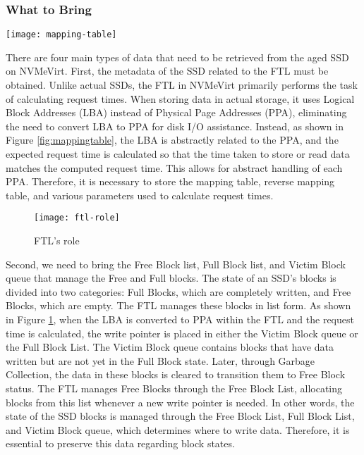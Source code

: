 \subsubsection{What to Bring}

\begin{figure*}[t]
    \centering
    \texttt{[image: mapping-table]}
    \caption{NVMeVirt’s relation between FTL and data save process}
    \label{fig:mappingtable}
\end{figure*}

There are four main types of data that need to be retrieved from the aged SSD on NVMeVirt.
First, the metadata of the SSD related to the FTL must be obtained.
Unlike actual SSDs, the FTL in NVMeVirt primarily performs the task of calculating request times.
When storing data in actual storage, it uses Logical Block Addresses (LBA) instead of Physical Page Addresses (PPA), eliminating the need to convert LBA to PPA for disk I/O assistance.
Instead, as shown in Figure \ref{fig:mappingtable}, the LBA is abstractly related to the PPA, and the expected request time is calculated so that the time taken to store or read data matches the computed request time.
This allows for abstract handling of each PPA.
Therefore, it is necessary to store the mapping table, reverse mapping table, and various parameters used to calculate request times.


\begin{figure}[t]
    \centering
    \texttt{[image: ftl-role]}
    \caption{FTL’s role}
    \label{fig:role}
\end{figure}

Second, we need to bring the Free Block list, Full Block list, and Victim Block queue that manage the Free and Full blocks.
The state of an SSD's blocks is divided into two categories: Full Blocks, which are completely written, and Free Blocks, which are empty.
The FTL manages these blocks in list form.
As shown in Figure \ref{fig:role}, when the LBA is converted to PPA within the FTL and the request time is calculated, the write pointer is placed in either the Victim Block queue or the Full Block List.
The Victim Block queue contains blocks that have data written but are not yet in the Full Block state.
Later, through Garbage Collection, the data in these blocks is cleared to transition them to Free Block status.
The FTL manages Free Blocks through the Free Block List, allocating blocks from this list whenever a new write pointer is needed.
In other words, the state of the SSD blocks is managed through the Free Block List, Full Block List, and Victim Block queue, which determines where to write data.
Therefore, it is essential to preserve this data regarding block states.

